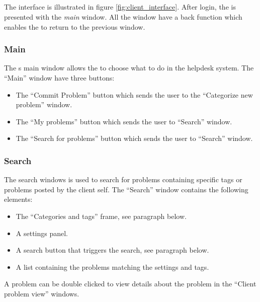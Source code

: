 \subsection{\cinterface}
\label{sec:client_interface}

The \aclient interface is illustrated in figure \ref{fig:client_interface}.
After login, the \aclient[] is presented with the \textit{main} window. All the window have a back function which enables the \aclient[] to return to the previous window.

\subsubsection{Main}
The \aclient s main window allows the \aclient to choose what to do in the helpdesk system. The ``Main'' window have three buttons:
\begin{itemize}
	\item The ``Commit Problem'' button which sends the user to the ``Categorize new problem'' window.
	\item The ``My problems'' button which sends the user to ``Search'' window.
	\item The ``Search for problems'' button which sends the user to ``Search'' window.
\end{itemize}


\subsubsection{Search}
The search windows is used to search for problems containing specific tags or problems posted by the client self. The ``Search'' window contains the following elements:
\begin{itemize}
	\item The ``Categories and tags'' frame, see paragraph below.
	\item A settings panel.
	\item A search button that triggers the search, see paragraph below.
	\item A list containing the problems matching the settings and tags.
\end{itemize}
A problem can be double clicked to view details about the problem in the ``Client problem view'' windows.

